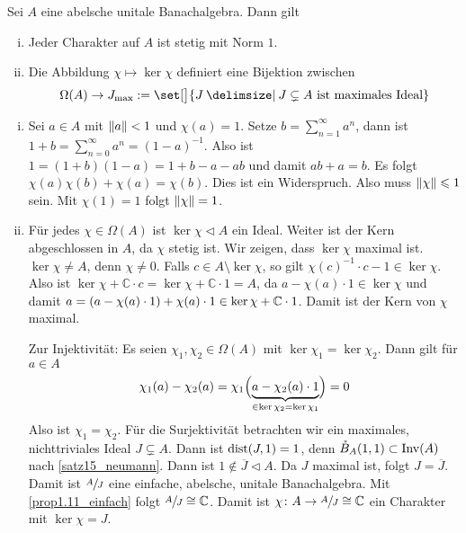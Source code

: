 \begin{satz}
	Sei $A$ eine abelsche unitale Banachalgebra. Dann gilt
	\begin{enumerate}[(i)]
		\item Jeder Charakter auf $A$ ist stetig mit Norm $1$.
		\item Die Abbildung $\chi \mapsto \ker \chi$ definiert eine Bijektion zwischen 
		\[
			\Omega(A) \to J_{\max} := \set[\big]{J \given J \subsetneq A \text{ ist maximales Ideal} }
		\]
	\end{enumerate}
\end{satz}
\begin{beweis}\leavevmode
	\begin{enumerate}[(i)]
		\item Sei $a \in A$ mit $\norm{a}<1$ und $\chi(a)=1$. Setze $b= \sum_{n=1}^{\infty} a^n$, dann ist $1 + b = \sum_{n=0}^{\infty} a^n = (1-a)^{-1}$. Also ist
		$1 = (1+b)(1-a) = 1 + b -a -ab$ und damit $ab+a=b$. Es folgt $\chi(a)\chi(b) + \chi(a)= \chi(b)$. Dies ist ein Widerspruch. Also muss $\norm{\chi}\le 1$ sein. Mit 
		$\chi(1)=1$ folgt $\norm{\chi}=1$.
		\item Für jedes $\chi \in \Omega(A)$ ist $\ker \chi \lhd A$ ein Ideal. Weiter ist der Kern abgeschlossen in $A$, da $\chi$ stetig ist. Wir zeigen, dass $\ker \chi$ maximal 
		ist. $\ker \chi \not= A$, denn $\chi \not= 0$. Falls $c \in A \setminus \ker \chi$, so gilt 
		\(
			\chi(c)^{-1} \cdot c-1 \in \ker \chi
		\).
		Also ist $\ker \chi + \mathbb{C} \cdot c = \ker \chi + \mathbb{C} \cdot 1=A$, da $a- \chi(a) \cdot 1 \in \ker \chi$ und damit 
		$a= \enbrace*{a- \chi(a) \cdot 1}+ \chi(a) \cdot 1 \in \ker \chi + \mathbb{C} \cdot 1$. Damit ist der Kern von $\chi$ maximal.
		
		Zur Injektivität: Es seien $\chi_1, \chi_2 \in \Omega(A)$ mit $\ker \chi_1 = \ker \chi_2$. Dann gilt für $a \in A$
		\begin{align}
			\chi_1(a) - \chi_2(a) = \chi_1 \enbrace[\Big]{\Underbrace{a - \chi_2(a) \cdot 1}{\in \ker \chi_2=\ker \chi_1}} = 0
		\end{align}
		Also ist $\chi_1=\chi_2$. Für die Surjektivität betrachten wir ein maximales, nichttriviales Ideal $J \subsetneq A$. Dann ist $\dist \enbrace*{J,1}=1$, denn 
		$\mathring{B}_A(1,1) \subset \Inv(A)$ nach \autoref{satz15_neumann}. Dann ist $1 \notin \overline{J} \lhd A$. Da $J$ maximal ist, folgt $J=\overline{J}$. Damit ist 
		$\sfrac{A}{J}$ eine einfache, abelsche, unitale Banachalgebra. Mit \autoref{prop1.11_einfach} folgt $\sfrac{A}{J} \cong \mathbb{C}$. Damit ist 
		$\chi \colon A \to \sfrac{A}{J} \cong \mathbb{C}$ ein Charakter mit $\ker \chi= J$. \qedhere
	\end{enumerate}
\end{beweis}






\cleardoubleoddemptypage
{}
\setcounter{page}{1}

\printindex
\listoffigures
\todototoc
{}
